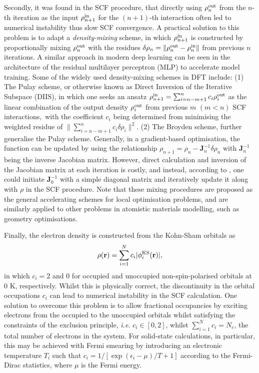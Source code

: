 Secondly, it was found in the SCF procedure, that directly using $\rho^{\scriptsize{\mbox{out}}}_n$ from the $n$-th iteration as the input $\rho^{\scriptsize{\mbox{in}}}_{n+1}$ for the $(n+1)$-th interaction often led to numerical instability thus slow SCF convergence. A practical solution to this problem is to adapt a \emph{density-mixing} scheme, in which $\rho^{\scriptsize{\mbox{in}}}_{n+1}$ is constructed by proportionally mixing $\rho^{\scriptsize{\mbox{out}}}_{n}$ with the residues $\delta\rho_n=\|\rho^{\scriptsize{\mbox{out}}}_{n}-\rho^{\scriptsize{\mbox{in}}}_{n}\|$ from previous $n$ iterations. A similar approach in modern deep learning can be seen in the architecture of the residual multilayer perceptron (MLP) to accelerate model training.\cite{he2016deep} Some of the widely used density-mixing schemes in DFT include: (1) The Pulay scheme,\cite{pulay1980convergence} or otherwise known as Direct Inversion of the Iterative Subspace (DIIS), in which one seeks an ansatz $\rho_{n+1}^{\scriptsize{\mbox{in}}}=\sum_{i=n-m+1}^{n}c_i \rho^{\scriptsize{\mbox{out}}}_i$ as the linear combination of the output density $\rho^{\scriptsize{\mbox{out}}}_i$ from previous $m$ $(m<n)$ SCF interactions, with the coefficient $c_i$ being determined from minimising the weighted residue of $\|\sum_{i=n-m+1}^{n}c_i \delta\rho_i\|^2$. (2) The Broyden scheme,\cite{johnson1988modified,broyden1965class} further generalise the Pulay scheme. Generally, in a gradient-based optimisation, the function can be updated by using the relationship $\rho_{n+1}=\rho_{n}-\bm{J}_n^{-1}\delta \rho_n$ with $\bm{J}_n^{-1}$  being the inverse Jacobian matrix. However, direct calculation and inversion of the Jacobian matrix at each iteration is costly, and instead, according to \citet{broyden1965class}, one could initiate $\bm{J}_{0}^{-1}$ with a simple diagonal matrix and iteratively update it along with $\rho$ in the SCF procedure. Note that these mixing procedures are proposed as the general accelerating schemes for local optimisation problems, and are similarly applied to other problems in atomistic materials modelling, such as geometry optimisations.

Finally, the electron density is constructed from the Kohn-Sham orbitals as 
\begin{equation}
    \label{eq:electron_density_KS_orbital}
\rho(\mathbf{r})=\sum_{i=1}^{N}c_i|\phi^{\mbox{\scriptsize{KS}}}_i(\mathbf{r})|,
\end{equation}
in which $c_i=2$ and 0 for occupied and unoccupied non-spin-polarised orbitals at 0 K, respectively. Whilst this is physically correct, the discontinuity in the orbital occupations $c_i$ can lead to numerical instability in the SCF calculation. One solution to overcome this problem is to allow fractional occupancies by exciting electrons from the occupied to the unoccupied orbitals whilst satisfying the constraints of the exclusion principle, \emph{i.e.} $c_{i}\in [0,2]$, whilst $\sum_{i=1}^{N} c_i=N_e$, the total number of electrons in the system. For solid-state calculations, in particular, this may be achieved with Fermi smearing by introducing an electronic temperature $T_i$ such that $c_i=1/[\exp (\epsilon_i-\mu)/T+1]$ according to the Fermi-Dirac statistics, where $\mu$ is the Fermi energy.

